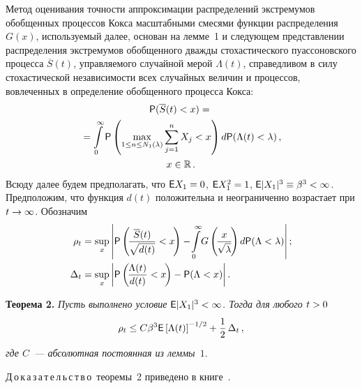 \begin{multicols}{2}
\smallskip

Метод оценивания точности аппроксимации распределений экстремумов
обобщенных процессов Кокса масштабными смесями функции распределения
$G(x)$, используемый далее, основан на лемме~1 и следующем
представлении распределения экстремумов обобщенного дважды
стохастического пуассоновского процесса $\overline S(t)$,
управляемого случайной мерой $\Lambda(t)$, справедливом в силу
стохастической независимости всех случайных величин и процессов,
вовлеченных в определение обобщенного процесса Кокса: 
\begin{multline*}
{\sf P}(\overline S(t)<x)={}\\
{}=\int\limits_{0}^{\infty}{\sf P}\left(\max\limits_{1\le n\le
N_1(\lambda)}\sum\limits_{j=1}^{n}X_j<x\right)
d{\sf P}(\Lambda(t)<\lambda)\,,\\
x\in\mathbb{R}\,.
\end{multline*}
Всюду далее будем предполагать, что ${\sf E}X_1\hm=0$, ${\sf
E}X_1^2\hm=1$, ${\sf E}|X_1|^3\hm\equiv\beta^3\hm<\infty$. Предположим, что
функция $d(t)$ положительна и неограниченно возрастает при
$t\hm\to\infty$. Обозначим
\begin{align*}
\rho_t&=\sup\limits_x\left\vert{\sf
P}\left(\!\fr{\overline
S(t)}{\sqrt{d(t)}}<x\!\right)-\!\il{0}{\infty}\!G\left(\!\fr{x}{\sqrt{\lambda}}\!\right)d{\sf
P}(\Lambda<\lambda)\right\vert;\\
\Delta_t&=\sup\limits_x\left\vert{\sf P}\left(\!\fr{\Lambda(t)}{d(t)}<x\!\right)-{\sf
P}(\Lambda<x)\right\vert.
\end{align*}

\smallskip

\noindent
\textbf{Теорема 2.} \textit{Пусть выполнено условие ${\sf
E}|X_1|^3\hm<\infty$. Тогда для любого $t\hm>0$ 
$$
\rho_t\le C\beta^3{\sf E}\left[\Lambda(t)\right]^{-1/2}+
\displaystyle\frac{\displaystyle 1\mathstrut}{\displaystyle 2\mathstrut}\,\Delta_t\,,
$$ 
где $C$~--- абсолютная постоянная из леммы~$1$}.

\smallskip

\noindent
Д\,о\,к\,а\,з\,а\,т\,е\,л\,ь\,с\,т\,в\,о~теоремы~2 приведено в 
книге~\cite{KorolevSokolov2008}.

\smallskip


\end{multicols}
